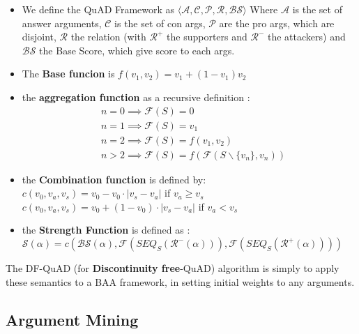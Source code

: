			\begin{definition}
				\begin{itemize}
					\item We define the QuAD Framework as $\langle \mathcal{A}, \mathcal{C}, \mathcal{P}, \mathcal{R}, \mathcal{BS}\rangle $ Where $\mathcal{A}$ is the set of answer arguments, $\mathcal{C}$ is the set of con args, $\mathcal{P}$ are the pro args, which are disjoint, $\mathcal{R}$ the relation (with $\mathcal{R}^+$ the supporters and $\mathcal{R}^-$ the attackers) and $\mathcal{BS}$ the Base Score, which give score to each args. 
					\item The \textbf{Base funcion} is $f(v_1, v_2) = v_1 + (1-v_1)v_2$
					\item the \textbf{aggregation function} as a recursive definition : 
					\begin{align*}
						& n=0 \implies \mathcal{F}(S)=0\\
						& n=1 \implies \mathcal{F}(S)= v_1\\
						& n=2 \implies \mathcal{F}(S)= f(v_1, v_2)\\
						& n>2 \implies \mathcal{F}(S)= f(\mathcal{F}(S\backslash \{v_n\}, v_n))
					\end{align*}
					\item the \textbf{Combination function} is defined by: \\
					$c(v_0, v_a, v_s) = v_0 - v_0 \cdot |v_s-v_a|$ if $v_a \geq v_s$\\
					$c(v_0, v_a, v_s) = v_0 + (1 - v_0 ) \cdot |v_s-v_a|$ if $v_a < v_s$
					\item the \textbf{Strength Function} is defined as : $\mathcal{S}(\alpha) = c(\mathcal{BS}(\alpha), \mathcal{F}(SEQ_S(\mathcal{R}^-(\alpha))), \mathcal{F}(SEQ_S(\mathcal{R}^+(\alpha))))$
				\end{itemize}
			\end{definition}

			The DF-QuAD (for \textbf{Discontinuity free}-QuAD) algorithm is simply to apply these semantics to a BAA framework, in setting initial weights to any arguments. 


	\subsection{Argument Mining}
